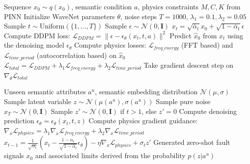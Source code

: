 \begin{algorithm}[h]
\caption{PC-Diffusion Training}
\label{alg:train}
\begin{algorithmic}[1]
\REQUIRE Sequence $x_0 \sim q(x_0)$, semantic condition $a$, physics constraints $M,C,K$ from PINN
\STATE Initialize WaveNet parameters $\theta$, noise steps $T=1000$, $\lambda_1=0.1, \lambda_2=0.05$
\REPEAT
    \STATE Sample $t \sim \text{Uniform}(\{1, \dots, T\})$
    \STATE Sample $\epsilon \sim \mathcal{N}(0, \mathbf{I})$
    \STATE $x_t = \sqrt{\bar{\alpha}_t}x_0 + \sqrt{1-\bar{\alpha}_t}\epsilon$
    \STATE Compute DDPM loss: $\mathcal{L}_{DDPM} = \| \epsilon - \epsilon_\theta(x_t, t, a) \|^2$
    \STATE Predict $\hat{x}_0$ from $x_t$ using the denoising model $\epsilon_\theta$
    \STATE Compute physics losses: $\mathcal{L}_{freq\_energy}$ (FFT based) and $\mathcal{L}_{time\_period}$ (autocorrelation based) on $\hat{x}_0$
    \STATE $\mathcal{L}_{total} = \mathcal{L}_{DDPM} + \lambda_1 \mathcal{L}_{freq\_energy} + \lambda_2 \mathcal{L}_{time\_period}$
    \STATE Take gradient descent step on $\nabla_\theta \mathcal{L}_{total}$
\end{algorithmic}
\end{algorithm}

\begin{algorithm}[h]
\caption{Zero-Shot Inference with PC-Diffusion}
\label{alg:infer}
\begin{algorithmic}[1]
\REQUIRE Unseen semantic attributes $a^u$, semantic embedding distribution $\mathcal{N}(\mu, \sigma)$
\STATE Sample latent variable $z \sim \mathcal{N}(\mu(a^u), \sigma(a^u))$
\STATE Sample pure noise $x_T \sim \mathcal{N}(0, \mathbf{I})$
    \STATE Sample $z' \sim \mathcal{N}(0, \mathbf{I})$ if $t > 1$, else $z' = 0$
    \STATE Compute denoising prediction $\epsilon_\theta = \epsilon_\theta(x_t, t, z)$
    \STATE Compute physics gradient guidance: $\nabla_x \mathcal{L}_{physics} = \lambda_1 \nabla_x \mathcal{L}_{freq\_energy} + \lambda_2 \nabla_x \mathcal{L}_{time\_period}$ 
    \STATE $x_{t-1} = \frac{1}{\sqrt{\alpha_t}} \left( x_t - \frac{1-\alpha_t}{\sqrt{1-\bar{\alpha}_t}} \epsilon_\theta \right) - \eta \nabla_x \mathcal{L}_{physics} + \sigma_t z'$
\ENDFOR
\RETURN Generated zero-shot fault signals $x_0$ and associated limits derived from the probability $p(z|a^u)$
\end{algorithmic}
\end{algorithm}
